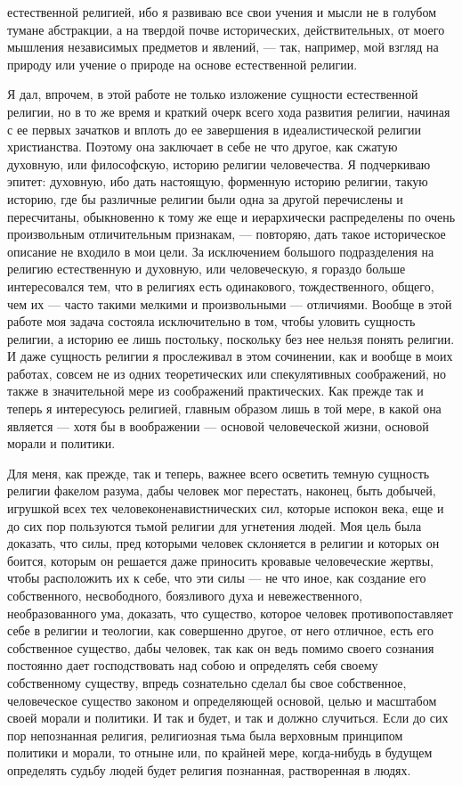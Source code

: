 \documentclass[12pt]{article}
\begin{document}
естественной религией, ибо я развиваю все свои учения и мысли не в голубом тумане абстракции, а на твердой почве исторических, действительных, от моего мышления независимых предметов и явлений, --- так, например, мой взгляд на природу или учение о природе на основе естественной религии. 

Я дал, впрочем, в этой работе не только изложение сущности естественной религии, но в то же время и краткий очерк всего хода развития религии, начиная с ее первых зачатков и вплоть до ее завершения в идеалистической религии христианства. Поэтому она заключает в себе не что другое, как сжатую духовную, или философскую, историю религии человечества. Я подчеркиваю эпитет: духовную, ибо дать настоящую, форменную историю религии, такую историю, где бы различные религии были одна за другой перечислены и пересчитаны, обыкновенно к тому же еще и иерархически распределены по очень произвольным отличительным признакам, --- повторяю, дать такое историческое описание не входило в мои цели. За исключением большого подразделения на религию естественную и духовную, или человеческую, я гораздо больше интересовался тем, что в религиях есть одинакового, тождественного, общего, чем их --- часто такими мелкими и произвольными --- отличиями. Вообще в этой работе моя задача состояла исключительно в том, чтобы уловить сущность религии, а историю ее лишь постольку, поскольку без нее нельзя понять религии. И даже сущность религии я прослеживал в этом сочинении, как и вообще в моих работах, совсем не из одних теоретических или спекулятивных соображений, но также в значительной мере из соображений практических. Как прежде так и теперь я интересуюсь религией, главным образом лишь в той мере, в какой она является --- хотя бы в воображении --- основой человеческой жизни, основой морали и политики. 

Для меня, как прежде, так и теперь, важнее всего осветить темную сущность религии факелом разума, дабы человек мог перестать, наконец, быть добычей, игрушкой всех тех человеконенавистнических сил, которые испокон века, еще и до сих пор пользуются тьмой религии для угнетения людей. Моя цель была доказать, что силы, пред которыми человек склоняется в религии и которых он боится, которым он решается даже приносить кровавые человеческие жертвы, чтобы расположить их к себе, что эти силы --- не что иное, как создание его собственного, несвободного, боязливого духа и невежественного, необразованного ума, доказать, что существо, которое человек противопоставляет себе в религии и теологии, как совершенно другое, от него отличное, есть его собственное существо, дабы человек, так как он ведь помимо своего сознания постоянно дает господствовать над собою и определять себя своему собственному существу, впредь сознательно сделал бы свое собственное, человеческое существо законом и определяющей основой, целью и масштабом своей морали и политики. И так и будет, и так и должно случиться. Если до сих пор непознанная религия, религиозная тьма была верховным принципом политики и морали, то отныне или, по крайней мере, когда-нибудь в будущем определять судьбу людей будет религия познанная, растворенная в людях. 
\end{document}
